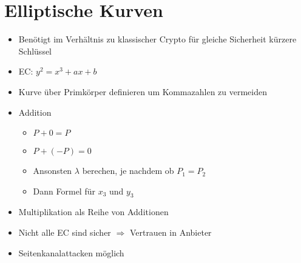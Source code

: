 \documentclass[11pt, paper=a4, twocolumn]{scrartcl}
\begin{document}
	\section{Elliptische Kurven}
		\begin{itemize}
			\item Benötigt im Verhältnis zu \glqq{}klassischer\grqq{} Crypto für gleiche Sicherheit kürzere Schlüssel
			\item EC: $y^2=x^3+ax+b$
			\item Kurve über Primkörper definieren um Kommazahlen zu vermeiden
			\item Addition
				\begin{itemize}
					\item $P+0=P$
					\item $P+(-P)=0$
					\item Ansonsten $\lambda$ berechen, je nachdem ob $P_1=P_2$
					\item Dann Formel für $x_3$ und $y_3$
				\end{itemize}
			\item Multiplikation als Reihe von Additionen
			\item Nicht alle EC sind sicher $\Rightarrow$ Vertrauen in Anbieter
			\item Seitenkanalattacken möglich
		\end{itemize}
\end{document}
